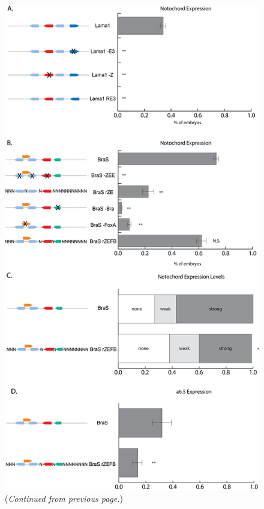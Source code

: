 \captionsetup[figure]{list=no}
\begin{figure}[p]
    \includegraphics[scale=.5]{1_figures-and-files/FigS5_Notochord-Counting.png}
    \caption{(\textit{Continued from previous page.})}
\end{figure}
\captionsetup[figure]{list=yes}
